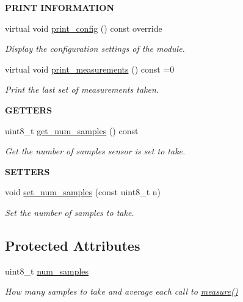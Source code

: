 \begin{Indent}{\bf P\+R\+I\+NT I\+N\+F\+O\+R\+M\+A\+T\+I\+ON}\par
\begin{DoxyCompactItemize}
\item 
virtual void \hyperlink{class_loom_sensor_aaa3bb2a2165029906c4ee815e790c89e}{print\+\_\+config} () const override
\begin{DoxyCompactList}\small\item\em Display the configuration settings of the module. \end{DoxyCompactList}\item 
virtual void \hyperlink{class_loom_sensor_aba2aa35441c2eb1cf27b95a1fc08b288}{print\+\_\+measurements} () const =0
\begin{DoxyCompactList}\small\item\em Print the last set of measurements taken. \end{DoxyCompactList}\end{DoxyCompactItemize}
\end{Indent}
\begin{Indent}{\bf G\+E\+T\+T\+E\+RS}\par
\begin{DoxyCompactItemize}
\item 
uint8\+\_\+t \hyperlink{class_loom_sensor_ae9a177765bd3ab79e002e98df6053ce0}{get\+\_\+num\+\_\+samples} () const 
\begin{DoxyCompactList}\small\item\em Get the number of samples sensor is set to take. \end{DoxyCompactList}\end{DoxyCompactItemize}
\end{Indent}
\begin{Indent}{\bf S\+E\+T\+T\+E\+RS}\par
\begin{DoxyCompactItemize}
\item 
void \hyperlink{class_loom_sensor_ad02e186edda41d4458246f329641d6f4}{set\+\_\+num\+\_\+samples} (const uint8\+\_\+t n)
\begin{DoxyCompactList}\small\item\em Set the number of samples to take. \end{DoxyCompactList}\end{DoxyCompactItemize}
\end{Indent}
\subsection*{Protected Attributes}
\begin{DoxyCompactItemize}
\item 
uint8\+\_\+t \hyperlink{class_loom_sensor_a0e74ebbaecde15ed1c71e1bb6bc6aebe}{num\+\_\+samples}
\begin{DoxyCompactList}\small\item\em How many samples to take and average each call to \hyperlink{class_loom_sensor_a390ef79a4d5d6b6386e099c7fe56ed1a}{measure()} \end{DoxyCompactList}\end{DoxyCompactItemize}
